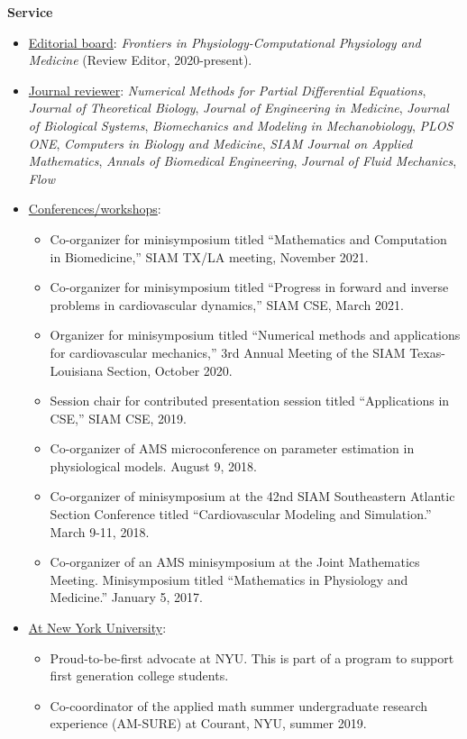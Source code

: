 \documentclass{article} %
\begin{document}
\vspace{0.5cm}
\noindent
{\bf \large Service}
\begin{itemize}
\item \underline{Editorial board}: {\em Frontiers in Physiology-Computational Physiology and Medicine} (Review Editor, 2020-present).
\item \underline{Journal reviewer}: {\em Numerical Methods for Partial Differential Equations}, {\em Journal of Theoretical Biology}, {\em Journal of Engineering in Medicine}, {\em Journal of Biological Systems}, {\em Biomechanics and Modeling in Mechanobiology}, {\em PLOS ONE}, {\em Computers in Biology and Medicine}, {\em SIAM Journal on Applied Mathematics}, {\em Annals of Biomedical Engineering}, {\em Journal of Fluid Mechanics}, {\em Flow}
\item \underline{Conferences/workshops}:
\begin{itemize}
\item Co-organizer for minisymposium titled ``Mathematics and Computation in Biomedicine,'' SIAM TX/LA meeting, November 2021.
\item Co-organizer for minisymposium titled ``Progress in forward and inverse problems in cardiovascular dynamics,'' SIAM CSE, March 2021.
\item Organizer for minisymposium titled ``Numerical methods and applications for cardiovascular mechanics,'' 3rd Annual Meeting of the
SIAM Texas-Louisiana Section, October 2020. 
\item Session chair for contributed presentation session titled ``Applications in CSE,'' SIAM CSE, 2019.
\item Co-organizer of AMS microconference on parameter estimation in physiological models.  August 9, 2018.
\item Co-organizer of minisymposium at the 42nd SIAM Southeastern Atlantic Section Conference titled ``Cardiovascular Modeling and Simulation.'' March 9-11, 2018. 
\item Co-organizer of an AMS minisymposium at the Joint Mathematics Meeting. Minisymposium titled ``Mathematics in Physiology and Medicine.'' January 5, 2017.
\end{itemize}
\item \underline{At New York University}:
\begin{itemize}
\item Proud-to-be-first advocate at NYU.  This is part of a program to support first generation college students.\item Co-coordinator of the applied math summer undergraduate research experience (AM-SURE) at Courant, NYU, summer 2019.

\end{itemize}
\end{itemize}
\end{document}
